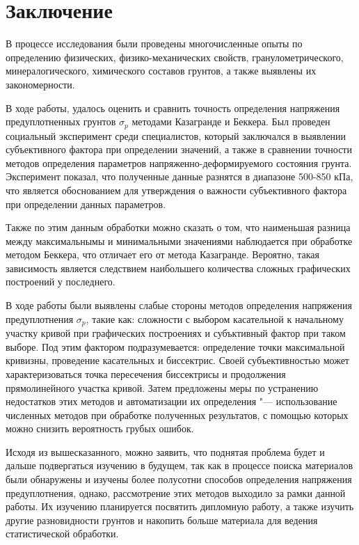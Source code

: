 \chapter*{Заключение}                       %


В процессе исследования были проведены многочисленные опыты по определению физических, физико-механических свойств, гранулометрического, минералогического, химического составов грунтов, а также выявлены их закономерности. 

В ходе работы, удалось оценить и сравнить точность определения напряжения предуплотненных грунтов $\sigma_p$ методами Казагранде и Беккера. Был проведен социальный эксперимент среди специалистов, который заключался в выявлении субъективного фактора при определении значений, а также в сравнении точности методов определения параметров напряженно-деформируемого состояния грунта. Эксперимент показал, что полученные данные разнятся в диапазоне 500-850 кПа, что является обоснованием для утверждения о важности субъективного фактора при определении данных параметров.

Также по этим данным обработки можно сказать о том, что наименьшая разница между максимальнымы и минимальными значениями наблюдается при обработке методом Беккера, что отличает его от метода Казагранде. Вероятно, такая зависимость является следствием наибольшего количества сложных графических построений у последнего.

В ходе работы были выявлены слабые стороны методов определения напряжения предуплотнения $\sigma_p$, такие как: сложности с выбором касательной к начальному участку кривой при графических построениях и субъктивный фактор при таком выборе. Под этим фактором подразумевается: определение точки максимальной кривизны, проведение касательных и биссектрис. Своей субъективностью может характеризоваться точка пересечения биссектрисы и продолжения прямолинейного участка кривой.
Затем предложены меры по устранению недостатков этих методов и автоматизации их определения "--- использование численных методов при обработке полученных результатов, с помощью которых можно снизить вероятность грубых ошибок.


Исходя из вышесказанного, можно заявить, что поднятая проблема будет и дальше подвергаться изучению в будущем, так как в процессе поиска материалов были обнаружены и изучены более полусотни способов определения напряжения предуплотнения, однако, рассмотрение этих методов выходило за рамки данной работы. 
Их изучению планируется посвятить дипломную работу, а также изучить другие разновидности грунтов и накопить больше материала для ведения статистической обработки.
